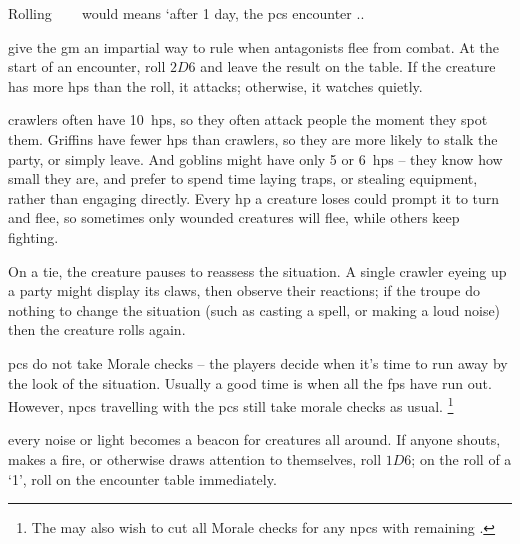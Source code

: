 \begin{multicols}{2}
Rolling ~~~ would means `after 1 day, the \glspl{pc} encounter ..

give the \gls{gm} an impartial way to rule when antagonists flee from combat.
At the start of an encounter, roll $2D6$ and leave the result on the table.
If the creature has more \glspl{hp} than the roll, it attacks; otherwise, it watches quietly.


\Glspl{crawler} often have 10~\glspl{hp}, so they often attack people the moment they spot them.
Griffins have fewer \glspl{hp} than \glspl{crawler}, so they are more likely to stalk the party, or simply leave.
And goblins might have only 5 or 6~\glspl{hp} -- they know how small they are, and prefer to spend time laying traps, or stealing equipment, rather than engaging directly.
Every \gls{hp} a creature loses could prompt it to turn and flee, so sometimes only wounded creatures will flee, while others keep fighting.

On a tie, the creature pauses to reassess the situation.
A single \gls{crawler} eyeing up a party might display its claws, then observe their reactions; if the troupe do nothing to change the situation (such as casting a spell, or making a loud noise) then the creature rolls again.

\Glspl{pc} do not take Morale checks -- the players decide when it's time to run away by the look of the situation.
Usually a good time is when all the \glspl{fp} have run out.
%
However, \glspl{npc} travelling with the \glspl{pc} still take morale checks as usual.%
\footnote{The  may also wish to cut all Morale checks for any \glspl{npc} with remaining .}%

every noise or light becomes a beacon for creatures all around.
If anyone shouts, makes a fire, or otherwise draws attention to themselves, roll $1D6$; on the roll of a `1', roll on the encounter table immediately.


\end{multicols}
